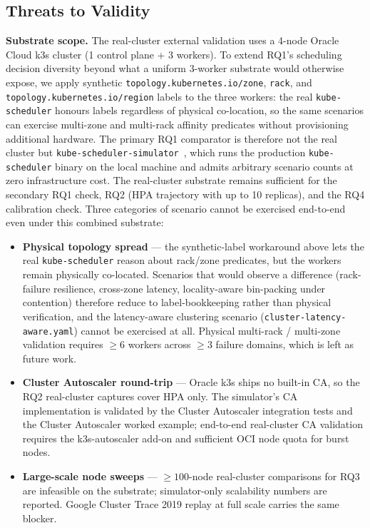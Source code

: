 \documentclass[ASNA,twocolumn]{USG}
\begin{document}
    \subsection{Threats to Validity}\label{sec:threats}

    \textbf{Substrate scope.}
    The real-cluster external validation uses a 4-node Oracle Cloud k3s
    cluster (1 control plane + 3 workers). To extend RQ1's scheduling
    decision diversity beyond what a uniform 3-worker substrate would
    otherwise expose, we apply synthetic
    \texttt{topology.kubernetes.io/zone}, \texttt{rack}, and
    \texttt{topology.kubernetes.io/region} labels to the three workers: the real
    \texttt{kube-scheduler} honours labels regardless of physical
    co-location, so the same scenarios can exercise multi-zone and
    multi-rack affinity predicates without provisioning additional
    hardware. The primary RQ1 comparator is therefore not the real
    cluster but \texttt{kube-scheduler-simulator}~\cite{KubeSchSim2025},
    which runs the production \texttt{kube-scheduler} binary on the
    local machine and admits arbitrary scenario counts at zero
    infrastructure cost. The real-cluster substrate remains
    sufficient for the secondary RQ1 check, RQ2 (HPA trajectory with up
    to 10 replicas), and the RQ4 calibration check. Three categories of
    scenario cannot be exercised end-to-end even under this combined
    substrate:

    \begin{itemize}
        \item \textbf{Physical topology spread} --- the synthetic-label
        workaround above lets the real \texttt{kube-scheduler} reason about
        rack/zone predicates, but the workers remain physically co-located.
        Scenarios that would observe a difference (rack-failure resilience,
        cross-zone latency, locality-aware bin-packing under contention)
        therefore reduce to label-bookkeeping rather than physical
        verification, and the latency-aware clustering scenario
        (\texttt{cluster-latency-aware.yaml}) cannot be exercised at all.
        Physical multi-rack / multi-zone validation requires $\geq 6$ workers
        across $\geq 3$ failure domains, which is left as future work.

        \item \textbf{Cluster Autoscaler round-trip} --- Oracle k3s ships no
        built-in CA, so the RQ2 real-cluster captures cover HPA only. The
        simulator's CA implementation is validated by the
        Cluster Autoscaler integration tests and the
        Cluster Autoscaler worked example; end-to-end
        real-cluster CA validation requires the k3s-autoscaler add-on and
        sufficient OCI node quota for burst nodes.

        \item \textbf{Large-scale node sweeps} --- $\geq 100$-node real-cluster
        comparisons for RQ3 are infeasible on the substrate; simulator-only
        scalability numbers are reported. Google Cluster Trace 2019 replay at
        full scale carries the same blocker.
    \end{itemize}
\end{document}
